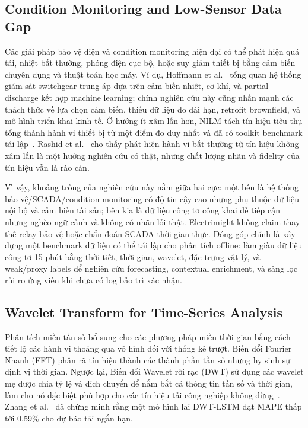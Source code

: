 \subsection{Condition Monitoring and Low-Sensor Data Gap}

Các giải pháp bảo vệ điện và condition monitoring hiện đại có thể phát hiện quá tải, nhiệt bất thường, phóng điện cục bộ, hoặc suy giảm thiết bị bằng cảm biến chuyên dụng và thuật toán học máy. Ví dụ, Hoffmann et al.~\cite{hoffmann2020switchgear} tổng quan hệ thống giám sát switchgear trung áp dựa trên cảm biến nhiệt, cơ khí, và partial discharge kết hợp machine learning; chính nghiên cứu này cũng nhấn mạnh các thách thức về lựa chọn cảm biến, thiếu dữ liệu đo dài hạn, retrofit brownfield, và mô hình triển khai kinh tế. Ở hướng ít xâm lấn hơn, NILM tách tín hiệu tiêu thụ tổng thành hành vi thiết bị từ một điểm đo duy nhất và đã có toolkit benchmark tái lập~\cite{batra2014nilmtk}. Rashid et al.~\cite{rashid2019nilm} cho thấy phát hiện hành vi bất thường từ tín hiệu không xâm lấn là một hướng nghiên cứu có thật, nhưng chất lượng nhãn và fidelity của tín hiệu vẫn là rào cản.

Vì vậy, khoảng trống của nghiên cứu này nằm giữa hai cực: một bên là hệ thống bảo vệ/SCADA/condition monitoring có độ tin cậy cao nhưng phụ thuộc dữ liệu nội bộ và cảm biến tài sản; bên kia là dữ liệu công tơ công khai dễ tiếp cận nhưng nghèo ngữ cảnh và không có nhãn lỗi thật. Electrimight không claim thay thế relay bảo vệ hoặc chẩn đoán SCADA thời gian thực. Đóng góp chính là xây dựng một benchmark dữ liệu có thể tái lập cho phân tích offline: làm giàu dữ liệu công tơ 15 phút bằng thời tiết, thời gian, wavelet, đặc trưng vật lý, và weak/proxy labels để nghiên cứu forecasting, contextual enrichment, và sàng lọc rủi ro ứng viên khi chưa có log bảo trì xác nhận.

\subsection{Wavelet Transform for Time-Series Analysis}

Phân tích miền tần số bổ sung cho các phương pháp miền thời gian bằng cách tiết lộ các hành vi thoáng qua vô hình đối với thống kê trượt. Biến đổi Fourier Nhanh (FFT) phân rã tín hiệu thành các thành phần tần số nhưng hy sinh sự định vị thời gian. Ngược lại, Biến đổi Wavelet rời rạc (DWT) sử dụng các wavelet mẹ được chia tỷ lệ và dịch chuyển để nắm bắt cả thông tin tần số và thời gian, làm cho nó đặc biệt phù hợp cho các tín hiệu tải công nghiệp không dừng~\cite{mallat1989}. Zhang et al.~\cite{zhang2024} đã chứng minh rằng một mô hình lai DWT-LSTM đạt MAPE thấp tới 0,59\% cho dự báo tải ngắn hạn.

